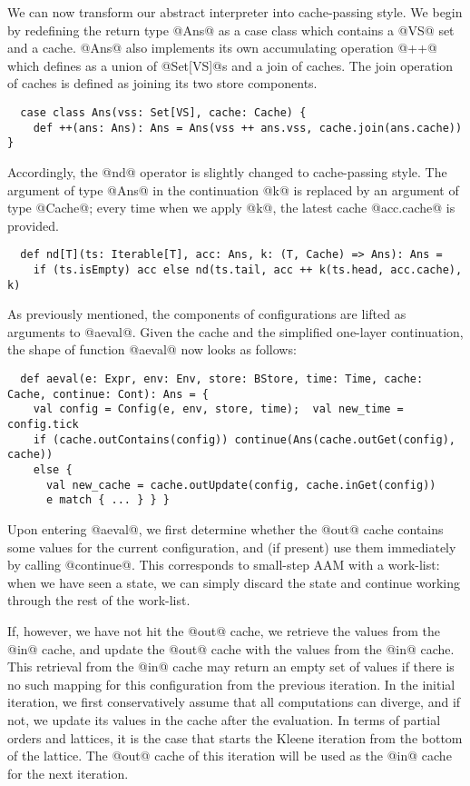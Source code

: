 \documentclass[acmsmall, screen]{acmart}\settopmatter{}
\begin{document}
We can now transform our abstract interpreter into cache-passing style. We begin by redefining the
return type @Ans@ as a case class which contains a @VS@ set and a cache. @Ans@ also implements
its own accumulating operation @++@ which defines as a union of @Set[VS]@s and a join of caches.
The join operation of caches is defined as joining its two store components.

\begin{lstlisting}
  case class Ans(vss: Set[VS], cache: Cache) {
    def ++(ans: Ans): Ans = Ans(vss ++ ans.vss, cache.join(ans.cache)) }
\end{lstlisting}

Accordingly, the @nd@ operator is slightly changed to cache-passing style. 
The argument of type @Ans@ in the continuation @k@ is replaced by an argument of type @Cache@;
every time when we apply @k@, the latest cache @acc.cache@ is provided.

\begin{lstlisting}
  def nd[T](ts: Iterable[T], acc: Ans, k: (T, Cache) => Ans): Ans =
    if (ts.isEmpty) acc else nd(ts.tail, acc ++ k(ts.head, acc.cache), k)
\end{lstlisting}

As previously mentioned, the components of configurations are lifted as arguments to
@aeval@. Given the cache and the simplified one-layer continuation, the shape of function 
@aeval@ now looks as follows:

\begin{lstlisting}
  def aeval(e: Expr, env: Env, store: BStore, time: Time, cache: Cache, continue: Cont): Ans = {
    val config = Config(e, env, store, time);  val new_time = config.tick
    if (cache.outContains(config)) continue(Ans(cache.outGet(config), cache))
    else {
      val new_cache = cache.outUpdate(config, cache.inGet(config))
      e match { ... } } }
\end{lstlisting}

Upon entering @aeval@, we first determine whether the @out@ cache contains some values
for the current configuration, and (if present) use them immediately by
calling @continue@.
This corresponds to small-step AAM with a work-list: when we have seen a state,
we can simply discard the state and continue working through the rest of the work-list.

If, however, we have not hit the @out@ cache, we retrieve the values from the @in@ cache,
and update the @out@ cache with the values from the @in@ cache. This retrieval from the @in@
cache may return an empty set of values if there is no such mapping for this configuration
from the previous iteration.
In the initial iteration, we first conservatively assume that all computations can diverge,
and if not, we update its values in the cache after the evaluation. In terms of partial orders and
lattices, it is the case that starts the Kleene iteration from the bottom of the lattice.
The @out@ cache of this iteration will be used as the @in@ cache for the next iteration.
\end{document}
